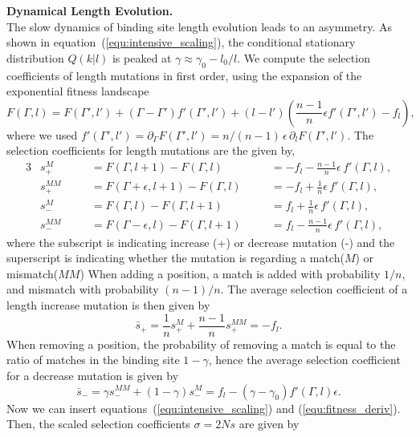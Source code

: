 \textbf{Dynamical Length Evolution.}\\

\noindent The slow dynamics of binding site length evolution leads to an asymmetry. As shown in equation~(\ref{equ:intensive_scaling}), the conditional stationary distribution $Q(k|l)$ is peaked at $\gamma \approx \gamma_0 - l_0/l$. We compute the selection coefficients of length mutations in first order, using the expansion of the exponential fitness landscape
\begin{equation}
	F(\Gamma, l) = F(\Gamma', l') + (\Gamma-\Gamma') f'(\Gamma', l') + (l-l') \left(\frac{n-1}{n}\epsilon f'(\Gamma', l') - f_l\right),
\end{equation}
where we used $f'(\Gamma', l') = \partial_\Gamma F(\Gamma', l') = n/(n-1)\, \epsilon \,\partial_l F(\Gamma', l')$.
The selection coefficients for length mutations are the given by,
\begin{alignat}{3}
	& s_+^M    \quad && = F(\Gamma, l+1) - F(\Gamma, l)          \quad && = -f_l - \frac{n-1}{n}\epsilon\,f'(\Gamma, l),\\
	& s_+^{MM} \quad && = F(\Gamma+\epsilon, l+1) - F(\Gamma, l) \quad && = -f_l + \frac{1}{n}\epsilon\,f'(\Gamma, l),\\
	& s_-^M    \quad && = F(\Gamma, l) - F(\Gamma, l+1)          \quad && = f_l + \frac{1}{n}\epsilon\,f'(\Gamma, l),\\
	& s_-^{MM} \quad && = F(\Gamma-\epsilon, l) - F(\Gamma, l+1) \quad && = f_l - \frac{n-1}{n}\epsilon\,f'(\Gamma, l),
\end{alignat}
where the subscript is indicating increase (+) or decrease mutation (-) and the superscript is indicating whether the mutation is regarding a match($M$) or mismatch($MM$)
When adding a position, a match is added with probability $1/n$, and mismatch with probability $(n-1)/n$. The average selection coefficient of a length increase mutation is then given by
\begin{equation}
	\bar s_+ = \frac{1}{n} s_+^M + \frac{n-1}{n} s_+^{MM} = -f_l.
\end{equation}
When removing a position, the probability of removing a match is equal to the ratio of matches in the binding site $1-\gamma$, hence the average selection coefficient for a decrease mutation is given by 
\begin{equation}
\bar s_- = \gamma s_-^{MM} + (1-\gamma) s_-^{M} = f_l - (\gamma - \gamma_0)f'(\Gamma, l)\epsilon.
\end{equation}
Now we can insert equations~(\ref{equ:intensive_scaling}) and (\ref{equ:fitness_deriv}). Then, the scaled selection coefficients $\sigma = 2Ns$ are given by
